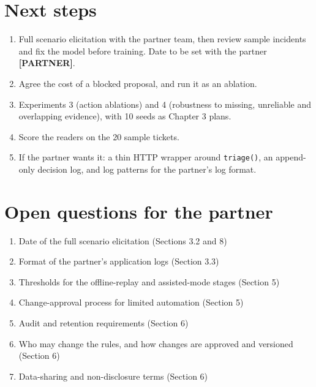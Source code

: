 \documentclass[11pt,a4paper]{article}
\newcommand{\partner}{\textbf{[PARTNER]}}
\begin{document}
\section{Next steps}

\begin{enumerate}
\item Full scenario elicitation with the partner team, then review sample incidents and fix the
  model before training. Date to be set with the partner \partner.
\item Agree the cost of a blocked proposal, and run it as an ablation.
\item Experiments 3 (action ablations) and 4 (robustness to missing, unreliable and overlapping
  evidence), with 10 seeds as Chapter 3 plans.
\item Score the readers on the 20 sample tickets.
\item If the partner wants it: a thin HTTP wrapper around \texttt{triage()}, an append-only
  decision log, and log patterns for the partner's log format.
\end{enumerate}

\section*{Open questions for the partner}

\begin{enumerate}
\item Date of the full scenario elicitation (Sections 3.2 and 8)
\item Format of the partner's application logs (Section 3.3)
\item Thresholds for the offline-replay and assisted-mode stages (Section 5)
\item Change-approval process for limited automation (Section 5)
\item Audit and retention requirements (Section 6)
\item Who may change the rules, and how changes are approved and versioned (Section 6)
\item Data-sharing and non-disclosure terms (Section 6)
\end{enumerate}
\end{document}

